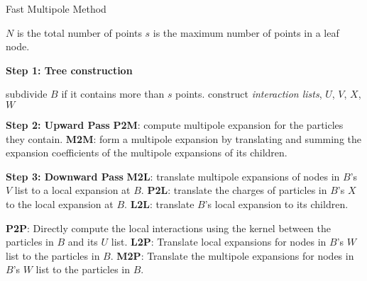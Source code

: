 \begin{algorithm}
\caption{Fast Multipole Method}
\label{alg:fmm:sec_1_2}
\begin{algorithmic}

    \State $N$ is the total number of points
    \State $s$ is the maximum number of points in a leaf node.

    \State
    \State \textbf{Step 1: Tree construction}
    
        \State subdivide $B$ if it contains more than $s$ points.
    \EndFor
        \State construct \textit{interaction lists}, $U$, $V$, $X$, $W$
    \EndFor
    
    \State 
    \State \textbf{Step 2: Upward Pass}
    \State \textbf{P2M}: compute multipole expansion for the particles they contain.
    \EndFor
    \State \textbf{M2M}: form a multipole expansion by translating and summing the expansion coefficients of the multipole expansions of its children.
    \EndFor

    \State
    \State \textbf{Step 3: Downward Pass}
    \State \textbf{M2L}: translate multipole expansions of nodes in $B$'s $V$ list to a local expansion at $B$.
    \State \textbf{P2L}: translate the charges of particles in $B$'s $X$ to the local expansion at $B$.
    \State \textbf{L2L}: translate $B$'s local expansion to its children.
    \EndFor 

    \State \textbf{P2P}: Directly compute the local interactions using the kernel between the particles in $B$ and its $U$ list.
    \State \textbf{L2P}: Translate local expansions for nodes in $B$'s $W$ list to the particles in $B$.
    \State \textbf{M2P}: Translate the multipole expansions for nodes in $B$'s $W$ list to the particles in $B$.
    \EndFor

\end{algorithmic}
\end{algorithm}


